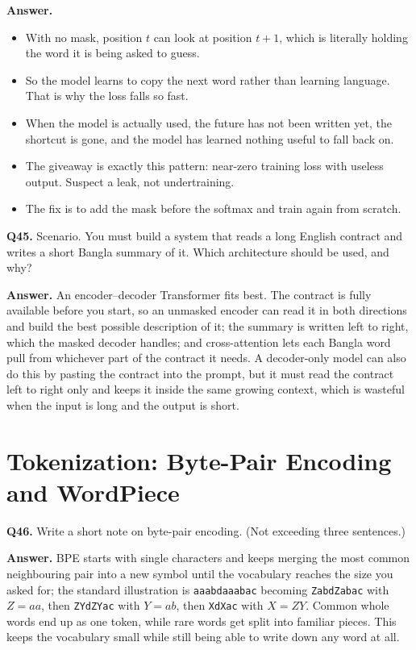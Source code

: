 \documentclass[11pt]{article}
\begin{document}
\textbf{Answer.}
\begin{itemize}
  \item With no mask, position $t$ can look at position $t+1$, which is literally holding the word it is being asked to guess.
  \item So the model learns to copy the next word rather than learning language. That is why the loss falls so fast.
  \item When the model is actually used, the future has not been written yet, the shortcut is gone, and the model has learned nothing useful to fall back on.
  \item The giveaway is exactly this pattern: near-zero training loss with useless output. Suspect a leak, not undertraining.
  \item The fix is to add the mask before the softmax and train again from scratch.
\end{itemize}

\medskip
\textbf{Q45.} Scenario. You must build a system that reads a long English contract and writes
a short Bangla summary of it. Which architecture should be used, and why?

\textbf{Answer.} An encoder--decoder Transformer fits best. The contract is fully available
before you start, so an unmasked encoder can read it in both directions and build the best
possible description of it; the summary is written left to right, which the masked decoder
handles; and cross-attention lets each Bangla word pull from whichever part of the contract it
needs. A decoder-only model can also do this by pasting the contract into the prompt, but it
must read the contract left to right only and keeps it inside the same growing context, which
is wasteful when the input is long and the output is short.

\section{Tokenization: Byte-Pair Encoding and WordPiece}

\textbf{Q46.} Write a short note on byte-pair encoding. (Not exceeding three sentences.)

\textbf{Answer.} BPE starts with single characters and keeps merging the most common
neighbouring pair into a new symbol until the vocabulary reaches the size you asked for; the
standard illustration is \texttt{aaabdaaabac} becoming \texttt{ZabdZabac} with $Z=aa$, then
\texttt{ZYdZYac} with $Y=ab$, then \texttt{XdXac} with $X=ZY$. Common whole words end up as
one token, while rare words get split into familiar pieces. This keeps the vocabulary small
while still being able to write down any word at all.
\end{document}
